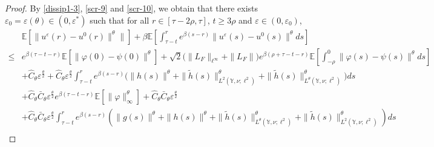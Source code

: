 \documentclass[11pt]{article}
\numberwithin{equation}{section}
\theoremstyle{plain}
\begin{document}
\begin{proof}
 By \eqref{dissip1-3}, \eqref{scr-9} and \eqref{scr-10}, 
 we obtain that there exists $\varepsilon_0 = \varepsilon(\theta) \in (0, \varepsilon^*)$ such that for all $r \in [\tau-2\rho, \tau]$, $t \ge 3\rho$ and $\varepsilon \in (0, \varepsilon_0)$,
 \begin{align} \label{scr-11}
       & \mathbb{E} \left[ \| u^{\varepsilon} (r) - u^0(r) \|^\theta \| \right] 
           + \beta \mathbb{E}
                               \left[ \int_{\tau-t}^{r} e^{\beta (s-r) } 
                                                \| u^{\varepsilon}(s) - u^0(s) \|^\theta  
                                        ds 
                               \right]  \nonumber\\              
  \le & e^{\beta (\tau-t-r)} \mathbb{E} \left[ \| \varphi(0) - \psi(0) \|^\theta \right] 
            + \sqrt{2}
 	                \big( \|L_{F}\|_{\ell^\infty} + \|L_{F}\| \big)  e^{\beta (\rho+\tau-t-r) }
                        \mathbb{E}
                               \left[ \int_{-\rho}^{0}
                                             \| \varphi(s) - \psi(s) \|^\theta ds
                               \right]  \nonumber\\
        & + \widehat{C}_\theta \varepsilon^{\frac{\theta}{2} }
            +\widehat{C}_\theta \varepsilon^{\frac{\theta}{2} } 
                     \int_{\tau-t}^{r} e^{\beta (s-r) }
                          \big( \| h(s) \|^\theta
                                   + \| \widetilde{h}(s) \|_{L^2(\mathbb{Y}, \nu; \ell^2) }^\theta
                                   + \| \widetilde{h}(s) \|^{\theta}_{L^{\theta}(\mathbb{Y}, \nu; \ell^2) }
                          \big)
                      ds  \nonumber\\            
        & + \widehat{C}_\theta  \bar{C}_\theta \varepsilon^{\frac{\theta}{2} }   
                e^{\beta (\tau-t-r)}
          	            \mathbb{E} \left[ \|\varphi\|_{\infty}^{\theta} \right] 
          	       +  \widehat{C}_\theta  \bar{C}_\theta \varepsilon^{\frac{\theta}{2} }   \nonumber\\
               & +  \widehat{C}_\theta \bar{C}_\theta \varepsilon^{\frac{\theta}{2} } 
               	     \int_{\tau-t}^{r} e^{\beta (s-r)}
          	             \left( \|g(s)\|^{\theta} 
          	                      + \|h(s)\|^{\theta} 
          	                      + \| \widetilde{h}(s)\|_{L^{\theta}(\mathbb{Y},\nu; \ell^2)}^\theta
          	                        + \| \widetilde{h}(s)\|_{L^{2}(\mathbb{Y},\nu; \ell^2)}^\theta
          	             \right) ds  \nonumber\\

\end{align}
\end{proof}
\end{document}
